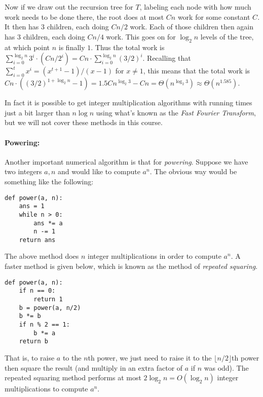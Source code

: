 \documentclass[11pt]{article}
\def\floor#1{\lfloor #1 \rfloor}
\begin{document}
Now if we draw out the recursion tree for $T$, labeling each node with
how
much work needs to be done there, the root does at most $Cn$ work for
some constant $C$.  It then has $3$ children, each doing $Cn/2$ work.
Each of those children then again has $3$ children, each doing $Cn/4$
work.  This goes on for $\log_2 n$ levels of the tree, at which point
$n$ is finally $1$.  Thus the total work is $\sum_{i=0}^{\log_2 n} 3^i
\cdot (Cn/2^i) = Cn \cdot \sum_{i=0}^{\log_2 n} (3/2)^i$.  Recalling that
$\sum_{i=0}^t x^i = (x^{t+1} - 1)/(x - 1)$ for $x\neq 1$, this means
that the total work is $Cn \cdot ((3/2)^{1 + \log_2 n} - 1) =
1.5Cn^{\log_2 3} - Cn =
\Theta(n^{\log_2 3}) \approx \Theta(n^{1.585})$.

In fact it is possible to get integer multiplication algorithms with
running times just a bit larger than $n \log n$ using what's known as
the {\em Fast Fourier Transform}, but we will not cover these methods
in this course.

\paragraph{\Large Powering:}
Another important numerical algorithm is that for {\em powering}.
Suppose we have two integers $a,n$ and would like to compute $a^n$.
The obvious way would be something like the following:

\begin{verbatim}
def power(a, n):
    ans = 1
    while n > 0:
        ans *= a
        n -= 1
    return ans
\end{verbatim}

The above method does $n$ integer multiplications in order to compute
$a^n$.  A faster method is given below, which is known as the method
of {\em repeated squaring}.

\begin{verbatim}
def power(a, n):
    if n == 0:
        return 1
    b = power(a, n/2)
    b *= b
    if n % 2 == 1:
        b *= a
    return b
\end{verbatim}

That is, to raise $a$ to the $n$th power, we just need to raise it to
the $\floor{n/2}$th power then square the result (and multiply in an extra
factor of $a$ if $n$ was odd).  The repeated squaring method performs
at
most $2\log_2 n = O(\log_2 n)$ integer multiplications to compute
$a^n$.
\end{document}
